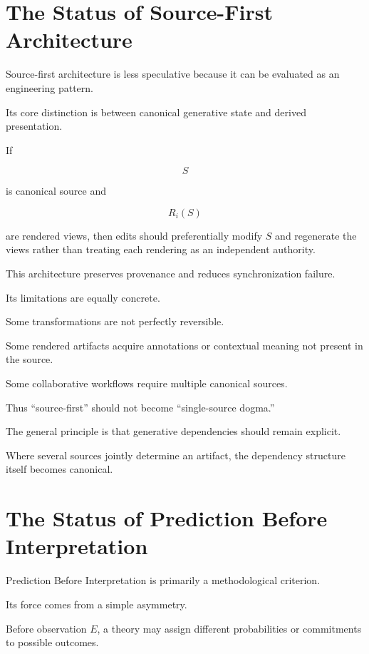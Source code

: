 \documentclass[11pt]{article}
\theoremstyle{remark}
\begin{document}
\section{The Status of Source-First Architecture}

Source-first architecture is less speculative because it can be evaluated as an
engineering pattern.

Its core distinction is between canonical generative state and derived
presentation.

If

\begin{equation}
S
\end{equation}

is canonical source and

\begin{equation}
R_i(S)
\end{equation}

are rendered views, then edits should preferentially modify $S$ and regenerate
the views rather than treating each rendering as an independent authority.

This architecture preserves provenance and reduces synchronization failure.

Its limitations are equally concrete.

Some transformations are not perfectly reversible.

Some rendered artifacts acquire annotations or contextual meaning not present in
the source.

Some collaborative workflows require multiple canonical sources.

Thus ``source-first'' should not become ``single-source dogma.''

The general principle is that generative dependencies should remain explicit.

Where several sources jointly determine an artifact, the dependency structure
itself becomes canonical.

\section{The Status of Prediction Before Interpretation}

Prediction Before Interpretation is primarily a methodological criterion.

Its force comes from a simple asymmetry.

Before observation $E$, a theory may assign different probabilities or
commitments to possible outcomes.
\end{document}

